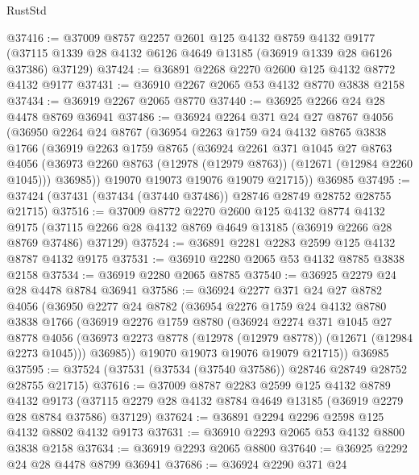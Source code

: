 \begin{lexlean}{RustStd}
\begin{coremodule}
@37416 := @37009
    @8757
    @2257
    @2601
    @125
    @4132
    @8759
    @4132
    @9177
    (@37115 @1339 @28 @4132 @6126 @4649 @13185 (@36919 @1339 @28 @6126 @37386) @37129)
@37424 := @36891 @2268 @2270 @2600 @125 @4132 @8772 @4132 @9177
@37431 := @36910 @2267 @2065 @53 @4132 @8770 @3838 @2158
@37434 := @36919 @2267 @2065 @8770
@37440 := @36925 @2266 @24 @28 @4478 @8769 @36941
@37486 := @36924
    @2264
    @371
    @24
    @27
    @8767
    @4056
    (@36950
      @2264
      @24
      @8767
      (@36954
        @2263
        @1759
        @24
        @4132
        @8765
        @3838
        @1766
        (@36919
          @2263
          @1759
          @8765
          (@36924
            @2261
            @371
            @1045
            @27
            @8763
            @4056
            (@36973 @2260 @8763 (@12978 (@12979 @8763)) (@12671 (@12984 @2260 @1045)))
            @36985))
        @19070
        @19073
        @19076
        @19079
        @21715))
    @36985
@37495 := @37424 (@37431 (@37434 (@37440 @37486)) @28746 @28749 @28752 @28755 @21715)
@37516 := @37009
    @8772
    @2270
    @2600
    @125
    @4132
    @8774
    @4132
    @9175
    (@37115 @2266 @28 @4132 @8769 @4649 @13185 (@36919 @2266 @28 @8769 @37486) @37129)
@37524 := @36891 @2281 @2283 @2599 @125 @4132 @8787 @4132 @9175
@37531 := @36910 @2280 @2065 @53 @4132 @8785 @3838 @2158
@37534 := @36919 @2280 @2065 @8785
@37540 := @36925 @2279 @24 @28 @4478 @8784 @36941
@37586 := @36924
    @2277
    @371
    @24
    @27
    @8782
    @4056
    (@36950
      @2277
      @24
      @8782
      (@36954
        @2276
        @1759
        @24
        @4132
        @8780
        @3838
        @1766
        (@36919
          @2276
          @1759
          @8780
          (@36924
            @2274
            @371
            @1045
            @27
            @8778
            @4056
            (@36973 @2273 @8778 (@12978 (@12979 @8778)) (@12671 (@12984 @2273 @1045)))
            @36985))
        @19070
        @19073
        @19076
        @19079
        @21715))
    @36985
@37595 := @37524 (@37531 (@37534 (@37540 @37586)) @28746 @28749 @28752 @28755 @21715)
@37616 := @37009
    @8787
    @2283
    @2599
    @125
    @4132
    @8789
    @4132
    @9173
    (@37115 @2279 @28 @4132 @8784 @4649 @13185 (@36919 @2279 @28 @8784 @37586) @37129)
@37624 := @36891 @2294 @2296 @2598 @125 @4132 @8802 @4132 @9173
@37631 := @36910 @2293 @2065 @53 @4132 @8800 @3838 @2158
@37634 := @36919 @2293 @2065 @8800
@37640 := @36925 @2292 @24 @28 @4478 @8799 @36941
@37686 := @36924
    @2290
    @371
    @24

\end{coremodule}
\end{lexlean}
